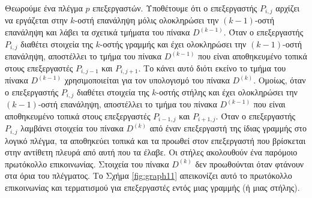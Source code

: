 \documentclass[12pt,a4paper]{article} %
\begin{document}
{{Θεωρούμε ένα πλέγμα $p$ επεξεργαστών. Υποθέτουμε ότι ο επεξεργαστής $P_{i,j}$ αρχίζει να εργάζεται στην $k$-οστή επανάληψη μόλις ολοκληρώσει την $(k-1)$-οστή επανάληψη και λάβει τα σχετικά τμήματα του πίνακα $D^{(k-1)}$. Όταν ο επεξεργαστής $P_{i,j}$ διαθέτει στοιχεία της $k$-οστής γραμμής και έχει ολοκληρώσει την $(k-1)$-οστή επανάληψη, αποστέλλει το τμήμα του πίνακα $D^{(k-1)}$ που είναι αποθηκευμένο τοπικά στους επεξεργαστές $P_{i,j-1}$ και $P_{i,j+1}$. Το κάνει αυτό διότι εκείνο το τμήμα του πίνακα $D^{(k-1)}$ χρησιμοποιείται για τον υπολογισμό του πίνακα $D^{(k)}$. Ομοίως, όταν ο επεξεργαστής $P_{i,j}$ διαθέτει στοιχεία της $k$-οστής στήλης και έχει ολοκληρώσει την $(k-1)$-οστή επανάληψη, αποστέλλει το τμήμα του πίνακα $D^{(k-1)}$ που είναι αποθηκευμένο τοπικά στους επεξεργαστές $P_{i-1,j}$ και $P_{i+1,j}$. Όταν ο επεξεργαστής $P_{i,j}$ λαμβάνει στοιχεία του πίνακα $D^{(k)}$ από έναν επεξεργαστή της ίδιας γραμμής στο λογικό πλέγμα, τα αποθηκεύει τοπικά και τα προωθεί στον επεξεργαστή που βρίσκεται στην αντίθετη πλευρά από αυτή που τα έλαβε. Οι στήλες ακολουθούν ένα παρόμοιο πρωτόκολλο επικοινωνίας. Στοιχεία του πίνακα $D^{(k)}$ δεν προωθούνται όταν φτάνουν στα όρια του πλέγματος. Το Σχήμα \ref{fig:graph11} απεικονίζει αυτό το πρωτόκολλο επικοινωνίας και τερματισμού για επεξεργαστές εντός μιας γραμμής (ή μιας στήλης).

\begin{figure}[H]
\centering
{}
\end{figure}}}
\end{document}

